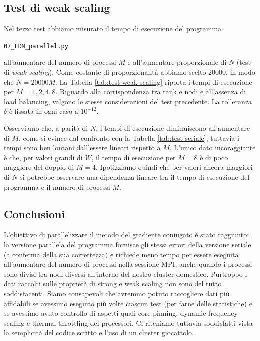 \documentclass[a4paper,11pt]{article}
\newcommand{\code}[1]{\begin{small}\texttt{#1}\end{small}}
\begin{document}
\subsection{Test di weak scaling}
Nel terzo test abbiamo misurato il tempo di esecuzione
del programma \code{07\_FDM\_parallel.py}
all'aumentare del numero di processi $M$ e all'aumentare
proporzionale di $N$ (test di \emph{weak scaling}).
Come costante di proporzionalità abbiamo scelto 20000,
in modo che $N = 20000 M$.
La Tabella \ref{tab:test-weak-scaling} riporta i tempi
di esecuzione per $M = 1,2,4,8$. Riguardo alla corrispondenza
tra rank e nodi e all'assenza di load balancing, valgono
le stesse considerazioni del test precedente.
La tolleranza $\delta$ è fissata in ogni caso a $10^{-12}$.

Osserviamo che, a parità di $N$, i tempi di esecuzione
diminuiscono all'aumentare di $M$, come si
evince dal confronto con la Tabella \ref{tab:test-seriale},
tuttavia i tempi sono ben lontani dall'essere lineari
rispetto a $M$. L'unico dato incoraggiante è che, per
valori grandi di $W$, il tempo di esecuzione per $M = 8$
è di poco maggiore del doppio di $M = 4$. Ipotizziamo quindi
che per valori ancora maggiori di $N$ si potrebbe osservare
una dipendenza lineare tra il tempo di esecuzione del
programma e il numero di processi $M$.

\subsection{Conclusioni}
L'obiettivo di parallelizzare il metodo del gradiente
coniugato è stato raggiunto: la versione parallela del programma
fornisce gli stessi errori della versione seriale (a conferma della
sua correttezza) e richiede meno tempo per essere eseguita
all'aumentare del numero di processi nella sessione MPI,
anche quando i processi sono divisi tra nodi diversi
all'interno del nostro cluster domestico.
Purtroppo i dati raccolti sulle proprietà di strong e weak
scaling non sono del tutto soddisfacenti.
Siamo consapevoli che avremmo potuto raccogliere
dati più affidabili se avessimo eseguito più volte ciascun test
(per farne delle statistiche) e se avessimo avuto controllo di
aspetti quali core pinning, dynamic frequency scaling
e thermal throttling dei processori. Ci riteniamo
tuttavia soddisfatti vista la semplicità del codice scritto
e l'uso di un cluster giocattolo.

\end{document}
